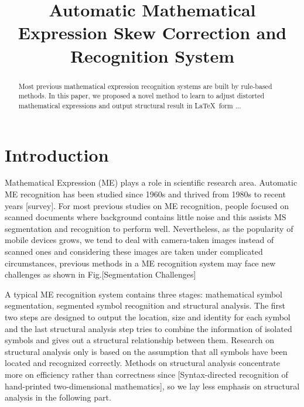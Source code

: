 \documentclass[10pt,conference,a4paper]{IEEEtran}
\begin{document}
	\title{Automatic Mathematical Expression Skew Correction and Recognition System}
	\author{
	}
	\maketitle
	\begin{abstract}
		Most previous mathematical expression recognition systems are built by rule-based methods. In this paper, we proposed a novel method to learn to adjust distorted mathematical expressions and output structural result in \LaTeX\ form ... 
	\end{abstract}
	
	\IEEEpeerreviewmaketitle
	\section{Introduction}
	Mathematical Expression (ME) plays a role in scientific research area. Automatic ME recognition has been studied since 1960s and thrived from 1980s to recent years [survey]. For most previous studies on ME recognition, people focused on scanned documents where background contains little noise and this assists MS segmentation and recognition to perform well. Nevertheless, as the popularity of mobile devices grows, we tend to deal with camera-taken images instead of scanned ones and considering these images are taken under complicated circumstances, previous methods in a ME recognition system may face new challenges as shown in Fig.[Segmentation Challenges]
	
	A typical ME recognition system contains three stages: mathematical symbol segmentation, segmented symbol recognition and structural analysis. The first two steps are designed to output the location, size and identity for each symbol and the last structural analysis step tries to combine the information of isolated symbols and gives out a structural relationship between them. Research on structural analysis only is based on the assumption that all symbols have been located and recognized correctly. Methods on structural analysis concentrate more on efficiency rather than correctness since [Syntax-directed recognition of hand-printed two-dimensional mathematics], so we lay less emphasis on structural analysis in the following part.
	
\end{document}
